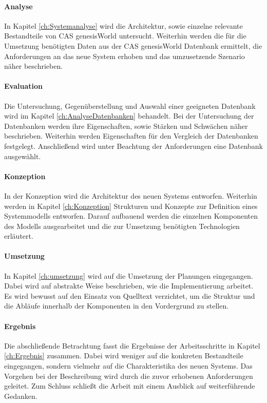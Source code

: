 \paragraph{Analyse} In Kapitel \ref{ch:Systemanalyse} wird die Architektur, sowie einzelne relevante Bestandteile von CAS genesisWorld untersucht. Weiterhin werden die für die Umsetzung benötigten Daten aus der CAS genesisWorld Datenbank ermittelt, die Anforderungen an das neue System erhoben und das umzusetzende Szenario näher beschrieben. 

\paragraph{Evaluation} Die Untersuchung, Gegenüberstellung und Auswahl einer geeigneten Datenbank wird im Kapitel \ref{ch:AnalyseDatenbanken} behandelt. Bei der Untersuchung der Datenbanken werden ihre Eigenschaften, sowie Stärken und Schwächen näher beschrieben. Weiterhin werden Eigenschaften für den Vergleich der Datenbanken festgelegt. Anschließend wird unter Beachtung der Anforderungen eine Datenbank ausgewählt.  

\paragraph{Konzeption} In der Konzeption wird die Architektur des neuen Systems entworfen. Weiterhin werden in Kapitel \ref{ch:Konzeption} Strukturen und Konzepte zur Definition eines Systemmodells entworfen. Darauf aufbauend werden die einzelnen Komponenten des Modells ausgearbeitet und die zur Umsetzung benötigten Technologien erläutert. 

\paragraph{Umsetzung} In Kapitel \ref{ch:umsetzung} wird auf die Umsetzung der Planungen eingegangen. Dabei wird auf abstrakte Weise beschrieben, wie die Implementierung arbeitet. Es wird bewusst auf den Einsatz von Quelltext verzichtet, um die Struktur und die Abläufe innerhalb der Komponenten in den Vordergrund zu stellen. 

\paragraph{Ergebnis} Die abschließende Betrachtung fasst die Ergebnisse der  Arbeitsschritte in Kapitel \ref{ch:Ergebnis} zusammen. Dabei wird weniger auf die konkreten Bestandteile eingegangen, sondern vielmehr auf die Charakteristika des neuen Systems. Das Vorgehen bei der Beschreibung wird durch die zuvor erhobenen Anforderungen geleitet. Zum Schluss schließt die Arbeit mit einem Ausblick auf weiterführende Gedanken.

